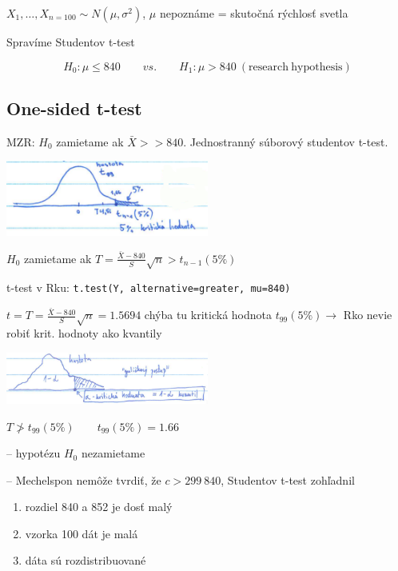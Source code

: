 \documentclass[unknownkeysallowed]{article}
\begin{document}
$X_1,\ldots,X_{n=100} \sim N(\mu, \sigma^2)$, $\mu$ nepoznáme = skutočná rýchlosť svetla

Spravíme Studentov t-test

$$H_0: \mu \leq 840 \qquad vs. \qquad H_1: \mu > 840 ~\mathrm{(research~hypothesis)}$$

\subsection*{One-sided t-test}
MZR: $H_0$ zamietame ak $\bar{X} >> 840$. Jednostranný súborový studentov t-test.

\begin{multicols}{2}
\includegraphics[width=0.5\textwidth]{imgs/obr15.png}
\columnbreak

$H_0$ zamietame ak $T=\frac{\bar{X}-840}{S}\sqrt{n} > t_{n-1} (5 \%)$
\end{multicols}

t-test v Rku: \texttt{t.test(Y, alternative=greater, mu=840)}

$t = T = \frac{\bar{X}-840}{S}\sqrt{n} = 1.5694$ chýba tu kritická hodnota $t_{99}(5\%) \to$ Rko nevie robiť krit. hodnoty ako kvantily

\begin{multicols}{2}
\includegraphics[width=0.5\textwidth]{imgs/obr16.png}
\columnbreak

$T \ngtr t_{99}(5\%) \qquad t_{99}(5\%) = 1.66$

-- hypotézu $H_0$ nezamietame
\end{multicols}

-- Mechelspon nemôže tvrdiť, že $c > 299~840$, Studentov t-test zohľadnil
\begin{enumerate}
\item rozdiel 840 a 852 je dosť malý
\item vzorka 100 dát je malá
\item dáta sú rozdistribuované
\end{enumerate}
\end{document}
